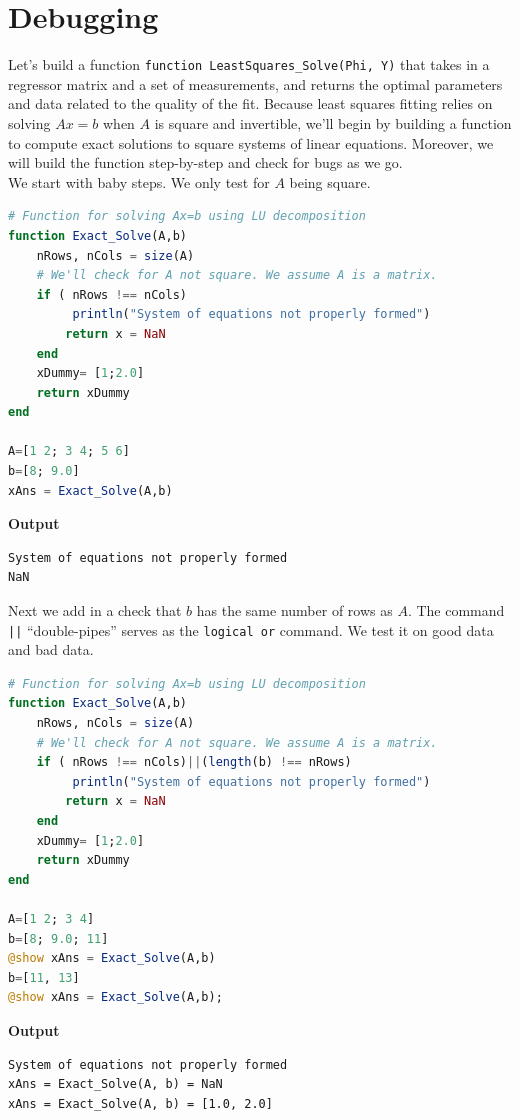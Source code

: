 \section{Debugging}

Let's build a function \texttt{function LeastSquares\_Solve(Phi, Y)} that takes in a regressor matrix and a set of measurements, and returns the optimal parameters and data related to the quality of the fit. Because least squares fitting relies on solving $Ax=b$ when $A$ is square and invertible, we'll begin by building a function to compute exact solutions to square systems of linear equations. Moreover, we will build the function step-by-step and check for bugs as we go.\\

We start with baby steps. We only test for $A$ being square.
\begin{lstlisting}[language=Julia,style=mystyle]
# Function for solving Ax=b using LU decomposition
function Exact_Solve(A,b)
    nRows, nCols = size(A) 
    # We'll check for A not square. We assume A is a matrix.
    if ( nRows !== nCols)
         println("System of equations not properly formed")
        return x = NaN
    end
    xDummy= [1;2.0]
    return xDummy
end

A=[1 2; 3 4; 5 6]
b=[8; 9.0]
xAns = Exact_Solve(A,b)
\end{lstlisting}
\textbf{Output} 
\begin{verbatim}
System of equations not properly formed
NaN
\end{verbatim}
Next we add in a check that $b$ has the same number of rows as $A$. The command \texttt{||} ``double-pipes'' serves as the \texttt{logical or} command. We test it on good data and bad data. 

\begin{lstlisting}[language=Julia,style=mystyle]
# Function for solving Ax=b using LU decomposition
function Exact_Solve(A,b)
    nRows, nCols = size(A) 
    # We'll check for A not square. We assume A is a matrix.
    if ( nRows !== nCols)||(length(b) !== nRows)
         println("System of equations not properly formed")
        return x = NaN
    end
    xDummy= [1;2.0]
    return xDummy
end

A=[1 2; 3 4]
b=[8; 9.0; 11]
@show xAns = Exact_Solve(A,b)
b=[11, 13]
@show xAns = Exact_Solve(A,b);
\end{lstlisting}
\textbf{Output} 
\begin{verbatim}
System of equations not properly formed
xAns = Exact_Solve(A, b) = NaN
xAns = Exact_Solve(A, b) = [1.0, 2.0]
\end{verbatim}

